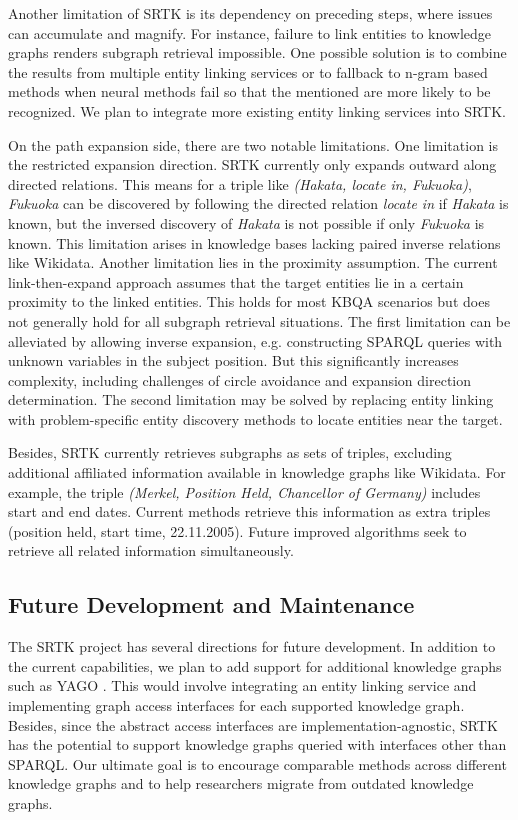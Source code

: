 \documentclass[runningheads]{llncs}
\begin{document}
Another limitation of SRTK is its dependency on preceding steps, where issues can accumulate and magnify. For instance, failure to link entities to knowledge graphs renders subgraph retrieval impossible. One possible solution is to combine the results from multiple entity linking services or to fallback to n-gram based methods when neural methods fail so that the mentioned are more likely to be recognized. We plan to integrate more existing entity linking services into SRTK.

On the path expansion side, there are two notable limitations. One limitation is the restricted expansion direction. SRTK currently only expands outward along directed relations. This means for a triple like \textit{(Hakata, locate in, Fukuoka)}, \textit{Fukuoka} can be discovered by following the directed relation \textit{locate in} if \textit{Hakata} is known, but the inversed discovery of \textit{Hakata} is not possible if only \textit{Fukuoka} is known. This limitation arises in knowledge bases lacking paired inverse relations like Wikidata. Another limitation lies in the proximity assumption. The current link-then-expand approach assumes that the target entities lie in a certain proximity to the linked entities. This holds for most KBQA scenarios but does not generally hold for all subgraph retrieval situations. The first limitation can be alleviated by allowing inverse expansion, e.g. constructing SPARQL queries with unknown variables in the subject position. But this significantly increases complexity, including challenges of circle avoidance and expansion direction determination. The second limitation may be solved by replacing entity linking with problem-specific entity discovery methods to locate entities near the target.

Besides, SRTK currently retrieves subgraphs as sets of triples, excluding additional affiliated information available in knowledge graphs like Wikidata. For example, the triple \textit{(Merkel, Position Held, Chancellor of Germany)} includes start and end dates. Current methods retrieve this information as extra triples (position held, start time, 22.11.2005). Future improved algorithms seek to retrieve all related information simultaneously.

\subsection{Future Development and Maintenance}

The SRTK project has several directions for future development. In addition to the current capabilities, we plan to add support for additional knowledge graphs such as YAGO \cite{pellissier2020yago}. This would involve integrating an entity linking service and implementing graph access interfaces for each supported knowledge graph. Besides, since the abstract access interfaces are implementation-agnostic, SRTK has the potential to support knowledge graphs queried with interfaces other than SPARQL. Our ultimate goal is to encourage comparable methods across different knowledge graphs and to help researchers migrate from outdated knowledge graphs.
\end{document}
